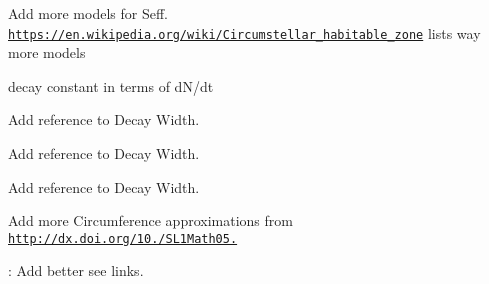 
\begin{DoxyRefList}
\item[\label{todo__todo000001}%
\Hypertarget{todo__todo000001}%
Module \mbox{\hyperlink{group___e_g_x_phys-_circumstellar_habitable_zone_limit}{E\+G\+X\+Phys-\/\+Circumstellar\+Habitable\+Zone\+Limit}} ]Add more models for Seff. \href{https://en.wikipedia.org/wiki/Circumstellar_habitable_zone}{\tt https\+://en.\+wikipedia.\+org/wiki/\+Circumstellar\+\_\+habitable\+\_\+zone} lists way more models  
\item[\label{todo__todo000002}%
\Hypertarget{todo__todo000002}%
Module \mbox{\hyperlink{group___e_g_x_phys-_decay_constant}{E\+G\+X\+Phys-\/\+Decay\+Constant}} ]decay constant in terms of d\+N/dt  
\item[\label{todo__todo000003}%
\Hypertarget{todo__todo000003}%
Module \mbox{\hyperlink{group___e_g_x_phys-_half_life}{E\+G\+X\+Phys-\/\+Half\+Life}} ]Add reference to Decay Width.  
\item[\label{todo__todo000004}%
\Hypertarget{todo__todo000004}%
Module \mbox{\hyperlink{group___e_g_x_phys-_nuclear_binding_energy}{E\+G\+X\+Phys-\/\+Nuclear\+Binding\+Energy}} ]Add reference to Decay Width.  
\item[\label{todo__todo000006}%
\Hypertarget{todo__todo000006}%
Module \mbox{\hyperlink{group___e_g_x_phys-_semi_empirical_mass_formula}{E\+G\+X\+Phys-\/\+Semi\+Empirical\+Mass\+Formula}} ]Add reference to Decay Width.  
\item[\label{todo__todo000007}%
\Hypertarget{todo__todo000007}%
File \mbox{\hyperlink{_ellipse_circumference_8hpp}{Ellipse\+Circumference.hpp}} ]Add more Circumference approximations from \href{http://dx.doi.org/10.3247/SL1Math05.004}{\tt http\+://dx.\+doi.\+org/10./\+S\+L1\+Math05.}  
\item[\label{todo__todo000005}%
\Hypertarget{todo__todo000005}%
File \mbox{\hyperlink{_nuclear_separation_energy_8hpp}{Nuclear\+Separation\+Energy.hpp}} ]\+: Add better see links. 
\end{DoxyRefList}